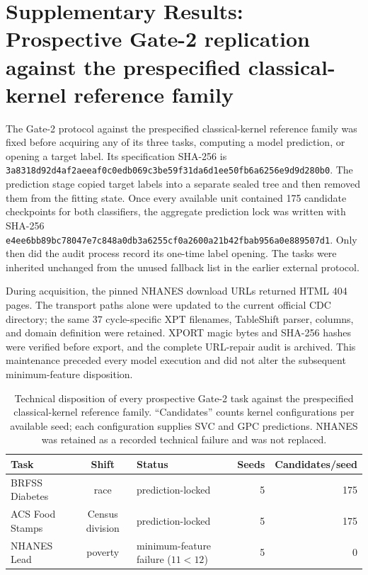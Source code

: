 \documentclass[11pt]{article}
\begin{document}
\section*{Supplementary Results: Prospective Gate-2 replication against the prespecified classical-kernel reference family}
\label{supp:v10_gate2}

The Gate-2 protocol against the prespecified classical-kernel reference family was fixed before acquiring any of its three tasks,
computing a model prediction, or opening a target label. Its specification
SHA-256 is
\texttt{3a8318d92d4af2ae\allowbreak eaf0c0edb069c3be\allowbreak 59f31da6d1ee50fb\allowbreak 6a6256e9d9d280b0}.
The prediction stage copied target labels into a separate sealed tree and
then removed them from the fitting state. Once every available unit contained
175 candidate checkpoints for both classifiers, the aggregate prediction
lock was written with SHA-256
\texttt{e4ee6bb89bc78047\allowbreak e7c848a0db3a6255\allowbreak cf0a2600a21b42fb\allowbreak ab956a0e889507d1}.
Only then did the audit process record its one-time label opening. The tasks
were inherited unchanged from the unused fallback list in the earlier
external protocol.

During acquisition, the pinned NHANES download URLs returned HTML 404 pages.
The transport paths alone were updated to the current official CDC directory;
the same 37 cycle-specific XPT filenames, TableShift parser, columns, and
domain definition were retained. XPORT magic bytes and SHA-256 hashes were
verified before export, and the complete URL-repair audit is archived. This
maintenance preceded every model execution and did not alter the subsequent
minimum-feature disposition.

\begin{table}[H]
\centering
\caption{Technical disposition of every prospective Gate-2 task against the prespecified classical-kernel reference family.
``Candidates'' counts kernel configurations per available seed; each
configuration supplies SVC and GPC predictions. NHANES was retained as a
recorded technical failure and was not replaced.}
\label{supp:tab_v10_availability}
\scriptsize
\setlength{\tabcolsep}{4pt}
\begin{tabular}{lclrr}
\toprule
Task & Shift & Status & Seeds & Candidates/seed\\
\midrule
BRFSS Diabetes & race & prediction-locked & 5 & 175\\
ACS Food Stamps & Census division & prediction-locked & 5 & 175\\
NHANES Lead & poverty & minimum-feature failure ($11<12$) & 5 & 0\\
\bottomrule
\end{tabular}
\end{table}
\end{document}
